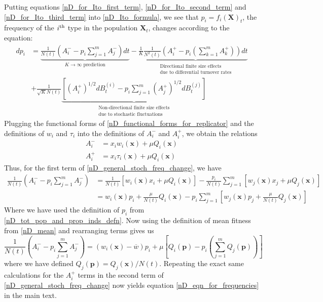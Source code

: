Putting equations \eqref{nD_for_Ito_first_term}, \eqref{nD_for_Ito_second_term} and \eqref{nD_for_Ito_third_term} into \eqref{nD_Ito_formula}, we see that $p_i = f_i(\mathbf{X})_t$, the frequency of the $i\textsuperscript{th}$ type in the population $\mathbf{X}_t$, changes according to the equation:
\begin{equation}
\label{nD_general_stoch_freq_change}
\begin{aligned}
dp_i &= \underbrace{\frac{1}{N(t)}\left(A^{-}_{i} - p_i\sum\limits_{j=1}^{m}A^{-}_{j}\right)dt}_{\text{$K \to \infty$ prediction}} - \frac{1}{K}\underbrace{\frac{1}{N^2(t)}\left(A^{+}_{i}-p_i\left(\sum\limits_{k=1}^{m} A^{+}_k\right)\right)dt}_{\substack{\text{Directional finite size effects}\\\text{due to differential turnover rates}}}\\
&+ \frac{1}{\sqrt{K} N(t)}\underbrace{\left[\left(A^{+}_{i}\right)^{1/2}dB^{(i)}_t - p_i\sum\limits_{j=1}^{m}\left(A^{+}_{j}\right)^{1/2}dB^{(j)}_t\right]}_{\substack{\text{Non-directional finite size effects}\\\text{due to stochastic fluctuations}}}
\end{aligned}
\end{equation}
Plugging the functional forms of \eqref{nD_functional_forms_for_replicator} and the definitions of $w_i$ and $\tau_i$ into the definitions of $A^{-}_i$ and $A^{+}_i$, we obtain the relations
\begin{equation}
\label{nD_det_limit_fitness_and_turnover}
\begin{aligned}
A^{-}_i &= x_iw_i(\mathbf{x}) + \mu Q_i(\mathbf{x})\\
A^{+}_i &= x_i\tau_i(\mathbf{x}) + \mu Q_i(\mathbf{x})
\end{aligned}
\end{equation}
Thus, for the first term of \eqref{nD_general_stoch_freq_change}, we have
\begin{align*}
\frac{1}{N(t)}\left(A^{-}_{i} - p_i\sum\limits_{j=1}^{m}A^{-}_{j}\right) &=  \frac{1}{N(t)}\left[w_i(\mathbf{x})x_i + \mu Q_i(\mathbf{x})\right] - \frac{p_i}{N(t)}\sum\limits_{j=1}^{m}\left[w_j(\mathbf{x})x_j + \mu Q_j(\mathbf{x})\right]\\
&= w_i(\mathbf{x})p_i + \frac{\mu}{N(t)}Q_i(\mathbf{x}) - p_i\sum\limits_{j=1}^{m}\left[w_j(\mathbf{x})p_j + \frac{\mu}{N(t)}Q_j(\mathbf{x})\right]
\end{align*}
Where we have used the definition of $p_i$ from \eqref{nD_tot_pop_and_prop_inds_defn}. Now using the definition of mean fitness from \eqref{nD_mean} and rearranging terms gives us
\begin{equation}
\frac{1}{N(t)}\left(A^{-}_{i} - p_i\sum\limits_{j=1}^{m}A^{-}_{j}\right) = (w_i(\mathbf{x}) - \overline{w})p_i + \mu\left[Q_i(\mathbf{p}) - p_i\left(\sum\limits_{j=1}^{m}Q_j(\mathbf{p})\right)\right]
\end{equation}
where we have defined $Q_j(\mathbf{p}) = Q_j(\mathbf{x})/N(t)$. Repeating the exact same calculations for the $A^{+}_i$ terms in the second term of \eqref{nD_general_stoch_freq_change} now yields equation \eqref{nD_eqn_for_frequencies} in the main text.